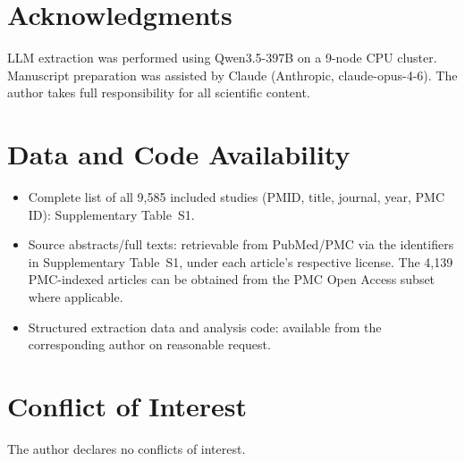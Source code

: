 \documentclass[12pt,a4paper]{article}
\begin{document}
\section*{Acknowledgments}

LLM extraction was performed using Qwen3.5-397B on a 9-node CPU cluster. Manuscript preparation was assisted by Claude (Anthropic, claude-opus-4-6). The author takes full responsibility for all scientific content.

\section*{Data and Code Availability}

\begin{itemize}
    \item Complete list of all 9,585 included studies (PMID, title, journal, year, PMC ID): Supplementary Table~S1.
    \item Source abstracts/full texts: retrievable from PubMed/PMC via the identifiers in Supplementary Table~S1, under each article's respective license. The 4,139 PMC-indexed articles can be obtained from the PMC Open Access subset where applicable.
    \item Structured extraction data and analysis code: available from the corresponding author on reasonable request.
\end{itemize}

\section*{Conflict of Interest}

The author declares no conflicts of interest.
\end{document}
